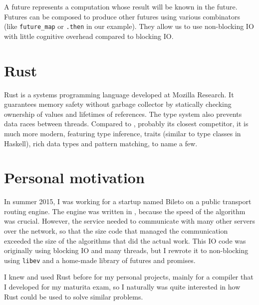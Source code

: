 
A future represents a computation whose result will be known in the future.
Futures can be composed to produce other futures using various combinators (like
\texttt{future_map} or \texttt{.then} in our example). They allow us to use
non-blocking IO with little cognitive overhead compared to blocking IO.

\section{Rust}

Rust is a systems programming language developed at Mozilla Research. It
guarantees memory safety without garbage collector by statically checking
ownership of values and lifetimes of references. The type system also prevents
data races between threads. Compared to \Cplusplus, probably its closest
competitor, it is much more modern, featuring type inference, traits (similar to
type classes in Haskell), rich data types and pattern matching, to name a few.

\section{Personal motivation}

In summer 2015, I was working for a startup named Bileto on a public transport
routing engine. The engine was written in \Cplusplus, because the speed of the
algorithm was crucial. However, the service needed to communicate with many
other servers over the network, so that the size code that managed the
communication exceeded the size of the algorithms that did the actual work. This
IO code was originally using blocking IO and many threads, but I rewrote it to
non-blocking using \texttt{libev} and a home-made library of futures and
promises.

I knew and used Rust before for my personal projects, mainly for a compiler that
I developed for my maturita exam, so I naturally was quite interested in how
Rust could be used to solve similar problems.
